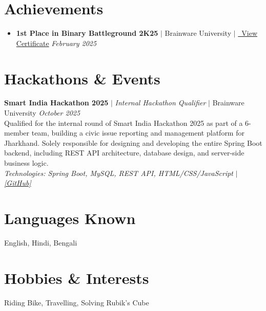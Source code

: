\documentclass[10pt, a4paper]{article}
\begin{document}
\section{Achievements}
\begin{itemize}[leftmargin=*, itemsep=4pt, topsep=2pt]
  \item \textbf{1st Place in Binary Battleground 2K25} $|$ Brainware University $|$ \href{https://drive.google.com/file/d/1klUmjWwahrMnXpMx_ync2RBuk1tg8U0F/view?usp=sharing}{\faExternalLinkAlt\ View Certificate} \hfill \textit{February 2025}
\end{itemize}

\section{Hackathons \& Events}

\textbf{Smart India Hackathon 2025} $|$ \textit{Internal Hackathon Qualifier} $|$ Brainware University \hfill \textit{October 2025} \\[2pt]
\small Qualified for the internal round of Smart India Hackathon 2025 as part of a 6-member team, building a civic issue reporting and management platform for Jharkhand. Solely responsible for designing and developing the entire Spring Boot backend, including REST API architecture, database design, and server-side business logic. \\
\small\textit{Technologies: Spring Boot, MySQL, REST API, HTML/CSS/JavaScript} $|$ \href{https://github.com/singhaganesh/jharkhand-civic-issue.git}{\textit{[GitHub]}}

\section{Languages Known}
English, Hindi, Bengali

\section{Hobbies \& Interests}
Riding Bike, Travelling, Solving Rubik's Cube
\end{document}
